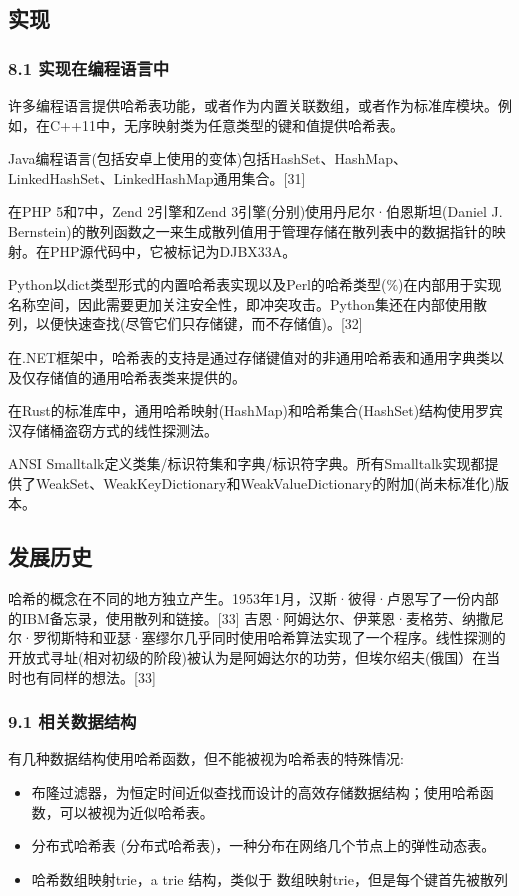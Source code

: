 \subsection{实现}
\subsubsection{8.1 实现在编程语言中}
许多编程语言提供哈希表功能，或者作为内置关联数组，或者作为标准库模块。例如，在C++11中，无序映射类为任意类型的键和值提供哈希表。

Java编程语言(包括安卓上使用的变体)包括HashSet、HashMap、LinkedHashSet、LinkedHashMap通用集合。[31]

在PHP 5和7中，Zend 2引擎和Zend 3引擎(分别)使用丹尼尔·伯恩斯坦(Daniel J. Bernstein)的散列函数之一来生成散列值用于管理存储在散列表中的数据指针的映射。在PHP源代码中，它被标记为DJBX33A。

Python以dict类型形式的内置哈希表实现以及Perl的哈希类型(\%)在内部用于实现名称空间，因此需要更加关注安全性，即冲突攻击。Python集还在内部使用散列，以便快速查找(尽管它们只存储键，而不存储值)。[32]

在.NET框架中，哈希表的支持是通过存储键值对的非通用哈希表和通用字典类以及仅存储值的通用哈希表类来提供的。

在Rust的标准库中，通用哈希映射(HashMap)和哈希集合(HashSet)结构使用罗宾汉存储桶盗窃方式的线性探测法。

ANSI Smalltalk定义类集/标识符集和字典/标识符字典。所有Smalltalk实现都提供了WeakSet、WeakKeyDictionary和WeakValueDictionary的附加(尚未标准化)版本。

\subsection{发展历史}
哈希的概念在不同的地方独立产生。1953年1月，汉斯·彼得·卢恩写了一份内部的IBM备忘录，使用散列和链接。[33] 吉恩·阿姆达尔、伊莱恩·麦格劳、纳撒尼尔·罗彻斯特和亚瑟·塞缪尔几乎同时使用哈希算法实现了一个程序。线性探测的开放式寻址(相对初级的阶段)被认为是阿姆达尔的功劳，但埃尔绍夫(俄国）在当时也有同样的想法。[33]
\subsubsection{9.1 相关数据结构}
有几种数据结构使用哈希函数，但不能被视为哈希表的特殊情况:
\begin{itemize}
\item 布隆过滤器，为恒定时间近似查找而设计的高效存储数据结构；使用哈希函数，可以被视为近似哈希表。
\item 分布式哈希表 (分布式哈希表)，一种分布在网络几个节点上的弹性动态表。
\item 哈希数组映射trie，a trie 结构，类似于 数组映射trie，但是每个键首先被散列
\end{itemize}

